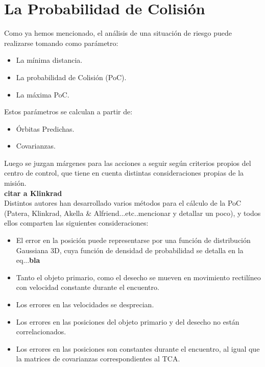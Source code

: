 \section{La Probabilidad de Colisi\'on}

Como ya hemos mencionado, el an\'alisis de una situaci\'on de riesgo puede realizarse tomando como par\'ametro:\\
\begin{itemize}
 \item La m\'inima distancia.
 \item La probabilidad de Colisi\'on (PoC).
 \item La m\'axima PoC.
\end{itemize}

Estos par\'ametros se calculan a partir de:
\begin{itemize}
 \item \'Orbitas Predichas.
 \item Covarianzas.
\end{itemize}

Luego se juzgan m\'argenes para las acciones a seguir seg\'un criterios propios del centro de control, que tiene en cuenta distintas consideraciones propias de la misi\'on.\\ 



{\bf{citar a Klinkrad}}
\\
Distintos autores han desarrollado varios m\'etodos para el c\'alculo de la PoC (Patera, Klinkrad, Akella \& Alfriend...etc..mencionar y detallar un poco), y todos ellos comparten las siguientes consideraciones:\\
\begin{itemize}
 \item El error en la posici\'on puede representarse por una funci\'on de distribuci\'on Gaussiana 3D, cuya funci\'on de densidad de probabilidad se detalla en la eq...{\bf{bla}} 
 \item Tanto el objeto primario, como el desecho se mueven en movimiento rectil\'ineo con velocidad constante durante el encuentro.
 \item Los errores en las velocidades se desprecian.
 \item Los errores en las posiciones del objeto primario y del desecho no est\'an correlacionados.
 \item Los errores en las posiciones son constantes durante el encuentro, al igual que la matrices de covarianzas correspondientes al TCA.
\end{itemize}

